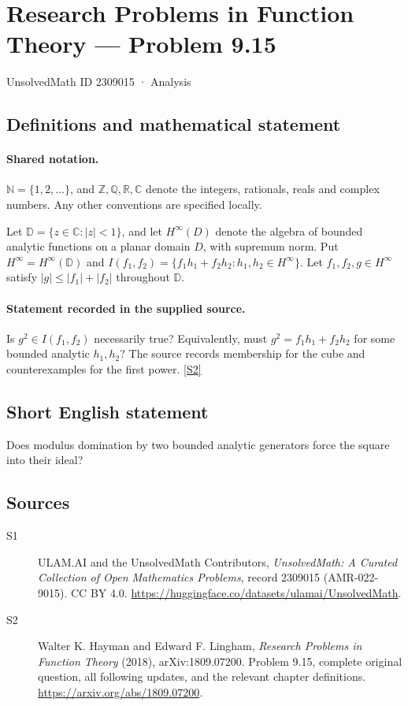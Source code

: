\documentclass[11pt]{book}
\newcommand{\sref}[2]{\hyperlink{source:#1:#2}{[S#2]}}
\begin{document}
\setcounter{section}{2309014}
\section{Research Problems in Function Theory — Problem 9.15}\label{2309015}
{\small\sffamily UnsolvedMath ID 2309015 · Analysis}
\subsection{Definitions and mathematical statement}

\paragraph{Shared notation.}$\mathbb N=\{1,2,\ldots\}$, and $\mathbb Z,\mathbb Q,\mathbb R,\mathbb C$ denote the integers, rationals, reals and complex numbers. Any other conventions are specified locally.


Let $\mathbb D=\{z\in\mathbb C:|z|<1\}$, and let $H^{\infty}(D)$ denote the algebra of bounded analytic functions on a planar domain $D$, with supremum norm. Put $H^{\infty}=H^{\infty}(\mathbb D)$ and $I(f_1,f_2)=\{f_1h_1+f_2h_2:h_1,h_2\in H^{\infty}\}$. Let $f_1,f_2,g\in H^{\infty}$ satisfy $|g|\le|f_1|+|f_2|$ throughout $\mathbb D$.
\paragraph{Statement recorded in the supplied source.}
Is $g^2\in I(f_1,f_2)$ necessarily true? Equivalently, must $g^2=f_1h_1+f_2h_2$ for some bounded analytic $h_1,h_2$? The source records membership for the cube and counterexamples for the first power. \sref{2309015}{2}
\subsection{Short English statement}
Does modulus domination by two bounded analytic generators force the square into their ideal?
\subsection{Sources}
\begin{description}
\item[\hypertarget{source:2309015:1}{S1}] ULAM.AI and the UnsolvedMath Contributors, \emph{UnsolvedMath: A Curated Collection of Open Mathematics Problems}, record 2309015 (AMR-022-9015). CC BY 4.0. \url{https://huggingface.co/datasets/ulamai/UnsolvedMath}.
\item[\hypertarget{source:2309015:2}{S2}] Walter K. Hayman and Edward F. Lingham, \emph{Research Problems in Function Theory} (2018), arXiv:1809.07200. Problem 9.15, complete original question, all following updates, and the relevant chapter definitions. \url{https://arxiv.org/abs/1809.07200}.
\end{description}
\label{end:2309015}
\end{document}
